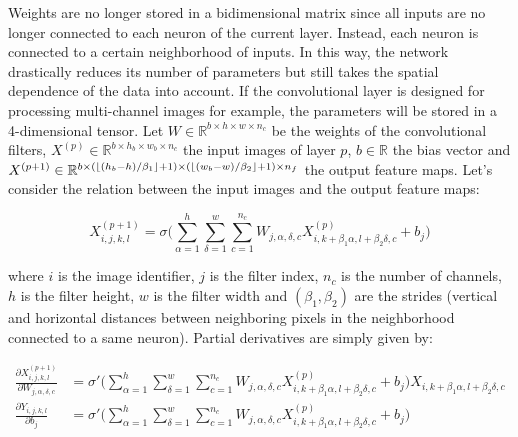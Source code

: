         Weights are no longer stored in a bidimensional matrix since all inputs are no longer connected to each neuron of the current layer.
        Instead, each neuron is connected to a certain neighborhood of inputs. In this way, the network drastically reduces its number of parameters
        but still takes the spatial dependence of the data into account. If the convolutional layer is designed for processing multi-channel images for example,
        the parameters will be stored in a 4-dimensional tensor. Let $W \in \mathbb{R}^{b \times h \times w \times n_c}$ be the weights of the convolutional filters,
        $X^{(p)} \in \mathbb{R}^{b \times h_b \times w_b \times n_c}$ the input images of layer $p$, $b \in \mathbb{R}$ the bias vector
        and $X^{(p+1)} \in \mathbb{R}^{b \times (\lfloor(h_b - h) / \beta_1\rfloor + 1) \times (\lfloor(w_b - w) / \beta_2\rfloor + 1) \times n_f}$
        the output feature maps. Let's consider the relation between the input images and the output feature maps:

        \begin{equation} \label{eq:conv2D}
            X_{i, j, k, l}^{(p+1)} = \sigma \Big( \sum\limits_{\alpha=1}^h \sum\limits_{\delta=1}^w
                \sum\limits_{c=1}^{n_c} W_{j, \alpha, \delta, c} X_{i, k+\beta_1 \alpha, l+\beta_2 \delta, c}^{(p)} + b_{j} \Big) 
        \end{equation}

            where $i$ is the image identifier, $j$ is the filter index, $n_c$ is the number of channels, $h$ is the filter height, $w$ is the filter width
            and $(\beta_1, \beta_2)$ are the strides (vertical and horizontal distances between neighboring pixels in the neighborhood connected to a same neuron).
            Partial derivatives are simply given by:

        \begin{align}
            \frac{\partial X_{i, j, k, l}^{(p+1)}}{\partial W_{j, \alpha, \delta, c}} & = 
                \sigma' \Big( \sum\limits_{\alpha=1}^h \sum\limits_{\delta=1}^w \sum\limits_{c=1}^{n_c} W_{j, \alpha, \delta, c}
                X_{i, k+\beta_1 \alpha, l+\beta_2 \delta, c}^{(p)} + b_{j} \Big) X_{i, k+\beta_1 \alpha, l+\beta_2 \delta, c} \\
            \frac{\partial Y_{i, j, k, l}}{\partial b_{j}} & =
                \sigma' \Big( \sum\limits_{\alpha=1}^h \sum\limits_{\delta=1}^w \sum\limits_{c=1}^{n_c} W_{j, \alpha, \delta, c}
                X_{i, k+\beta_1 \alpha, l+\beta_2 \delta, c}^{(p)} + b_{j} \Big)
        \end{align}

